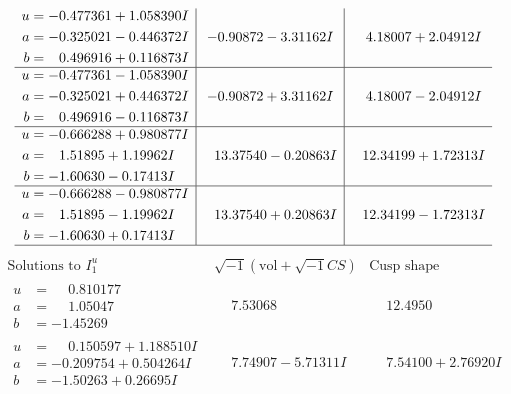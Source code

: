 \documentclass[1p]{elsarticle_modified}
\theoremstyle{definition}
\newcommand{\I}{\sqrt{-1}}
\begin{document}
$$\begin{array}{c|c|c}
\begin{aligned}
u &= -0.477361 + 1.058390 I \\
a &= -0.325021 - 0.446372 I \\
b &= \phantom{-}0.496916 + 0.116873 I\end{aligned}
 & -0.90872 - 3.31162 I & \phantom{-}4.18007 + 2.04912 I \\ \hline\begin{aligned}
u &= -0.477361 - 1.058390 I \\
a &= -0.325021 + 0.446372 I \\
b &= \phantom{-}0.496916 - 0.116873 I\end{aligned}
 & -0.90872 + 3.31162 I & \phantom{-}4.18007 - 2.04912 I \\ \hline\begin{aligned}
u &= -0.666288 + 0.980877 I \\
a &= \phantom{-}1.51895 + 1.19962 I \\
b &= -1.60630 - 0.17413 I\end{aligned}
 & \phantom{-}13.37540 - 0.20863 I & \phantom{-}12.34199 + 1.72313 I \\ \hline\begin{aligned}
u &= -0.666288 - 0.980877 I \\
a &= \phantom{-}1.51895 - 1.19962 I \\
b &= -1.60630 + 0.17413 I\end{aligned}
 & \phantom{-}13.37540 + 0.20863 I & \phantom{-}12.34199 - 1.72313 I\\
 \hline 
 \end{array}$$\newpage$$\begin{array}{c|c|c}  
\text{Solutions to }I^u_{1}& \I (\text{vol} + \sqrt{-1}CS) & \text{Cusp shape}\\
 \hline 
\begin{aligned}
u &= \phantom{-}0.810177\phantom{ +0.000000I} \\
a &= \phantom{-}1.05047\phantom{ +0.000000I} \\
b &= -1.45269\phantom{ +0.000000I}\end{aligned}
 & \phantom{-}7.53068\phantom{ +0.000000I} & \phantom{-}12.4950\phantom{ +0.000000I} \\ \hline\begin{aligned}
u &= \phantom{-}0.150597 + 1.188510 I \\
a &= -0.209754 + 0.504264 I \\
b &= -1.50263 + 0.26695 I\end{aligned}
 & \phantom{-}7.74907 - 5.71311 I & \phantom{-}7.54100 + 2.76920 I \\ \hline\begin{aligned}

\end{aligned}
\end{array}$$
\end{document}
